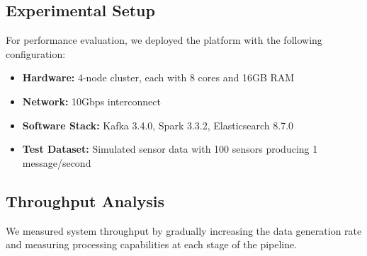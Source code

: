 \documentclass[11pt, a4paper]{article}
\begin{document}
\subsection{Experimental Setup}
For performance evaluation, we deployed the platform with the following configuration:
\begin{itemize}[leftmargin=*]
  \item \textbf{Hardware:} 4-node cluster, each with 8 cores and 16GB RAM
  \item \textbf{Network:} 10Gbps interconnect
  \item \textbf{Software Stack:} Kafka 3.4.0, Spark 3.3.2, Elasticsearch 8.7.0
  \item \textbf{Test Dataset:} Simulated sensor data with 100 sensors producing 1 message/second
\end{itemize}

\subsection{Throughput Analysis}
We measured system throughput by gradually increasing the data generation rate and measuring processing capabilities at each stage of the pipeline.
\end{document}
